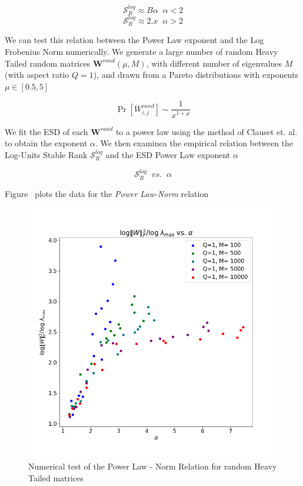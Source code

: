 $$\mathcal{S}^{log}_{R}\approx B\alpha\;\;\alpha<2$$
$$\mathcal{S}^{log}_{R}\approx 2.x\;\;\alpha>2$$


We can test this relation between the Power Law exponent and the Log Frobenius Norm numerically.
We generate a large number of random Heavy Tailed random matrices $\mathbf{W}^{rand}(\mu,M)$, 
with different number of eigenvalues $M$ (with aspect ratio $Q=1$), 
and drawn from a Pareto distributions with exponents $\mu\in[0.5, 5]$

$$\Pr[{W}^{rand}_{i,j}]\sim\dfrac{1}{x^{1+\mu}}$$

We fit the ESD of each $\mathbf{W}^{rand}$ to a power law using the method of Clauset et. al.
to obtain the exponent $\alpha$.  We then examinea the empirical relation between  the Log-Units Stable Rank 
$\mathcal{S}^{log}_{R}$ and the ESD Power Law exponent $\alpha$

$$\mathcal{S}^{log}_{R}\;\;vs.\;\;\alpha$$



Figure~\cite{randW} plots the data for the \emph{Power Law-Norm} relation

\begin{figure}[!htb]
 \centering
   \includegraphics[scale=0.40]{img/Alpha-LogNorm-Relations.png}
   \caption{
Numerical test of the  Power Law - Norm Relation for random Heavy Tailed matrices
}
  \label{fig:randW}
\end{figure}

